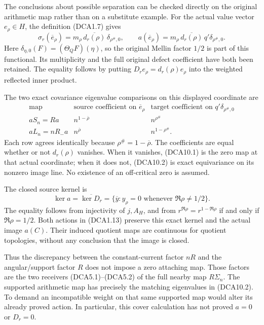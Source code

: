 The conclusions about possible separation can be checked directly on the
original arithmetic map rather than on a substitute example. For the
actual value vector \(e_\rho\in H\), the definition (DCA1.7) gives \[
\sigma_r(\overline e_\rho)
=m_\rho\,\overline{d_r(\rho)}\,\delta_{\rho^\#,0},\qquad
a(\overline e_\rho)
=m_\rho\,\overline{d_r(\rho)}\,q'\delta_{\rho^\#,0}.
\tag{DCA10.1}
\] Here \(\delta_{\eta,0}(F)=(\Theta_QF)(\eta)\), so the original Mellin
factor \(1/2\) is part of this functional. Its multiplicity and the full
original defect coefficient have both been retained. The equality
follows by putting \(D_re_\rho=d_r(\rho)e_\rho\) into the weighted
reflected inner product.

The two exact covariance eigenvalue comparisons on this displayed
coordinate are \[
\begin{array}{c|c|c}
\text{map}&\text{source coefficient on }\overline e_\rho
&\text{target coefficient on }q'\delta_{\rho^\#,0}\\\hline
aS_n=Ra&n^{1-\overline\rho}&n^{\rho^\#}\\
aL_n=nR_-a&n^{\overline\rho}&n^{1-\rho^\#}.
\end{array}
\tag{DCA10.2}
\] Each row agrees identically because \(\rho^\#=1-\overline\rho\). The
coefficients are equal whether or not \(d_r(\rho)\) vanishes. When it
vanishes, (DCA10.1) is the zero map at that actual coordinate; when it
does not, (DCA10.2) is exact equivariance on its nonzero image line. No
existence of an off-critical zero is assumed.

The closed source kernel is \[
\ker a=\overline{\ker D_r}
=\{\overline y:y_\rho=0\text{ whenever }\Re\rho\ne1/2\}.
\tag{DCA10.3}
\] The equality follows from injectivity of \(j,A_H\), and from
\(r^{\Re\rho}=r^{1-\Re\rho}\) if and only if \(\Re\rho=1/2\). Both
actions in (DCA1.13) preserve this exact kernel and the actual image
\(a(C)\). Their induced quotient maps are continuous for quotient
topologies, without any conclusion that the image is closed.

Thus the discrepancy between the constant-current factor \(nR\) and the
angular/support factor \(R\) does not impose a zero attaching map. Those
factors are the two receivers (DCA5.1)--(DCA5.2) of the full nearby map
\(R\Sigma_n\). The supported arithmetic map has precisely the matching
eigenvalues in (DCA10.2). To demand an incompatible weight on that same
supported map would alter its already proved action. In particular, this
cover calculation has not proved \(a=0\) or \(D_r=0\).


